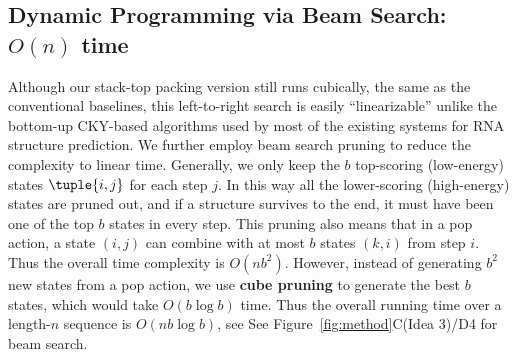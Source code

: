 \subsection*{Dynamic Programming via Beam Search: $O(n)$ time}
Although our stack-top packing version still runs cubically, the same as the
conventional baselines, 
 this left-to-right search is easily ``linearizable'' 
unlike the bottom-up CKY-based algorithms used by most of the existing systems for RNA structure prediction.
We further employ beam search pruning \cite{huang+:2012} 
to reduce the complexity to linear time.
Generally, we only keep the $b$ top-scoring (low-energy) states $\tuple{i, j}$ 
for each step $j$. In this way all the lower-scoring (high-energy) states are pruned
out, and if a
structure survives to the end, it must have been one of the top $b$
states in every step.
This pruning also means that in a pop action, a state $(i,j)$ can combine with at most $b$ states $(k,i)$ from step $i$.
Thus the overall time complexity is $O(nb^2)$.
However, instead of generating $b^2$ new states from a pop action, %
we use \textbf{cube pruning} \cite{huang+chiang:2007} to generate the best
$b$ states, which would take $O(b\log b)$ time.
Thus the overall running time over a length-$n$ sequence is $O(nb\log b)$, see 
See Figure~\ref{fig:method}C(Idea 3)/D4 for beam search.



